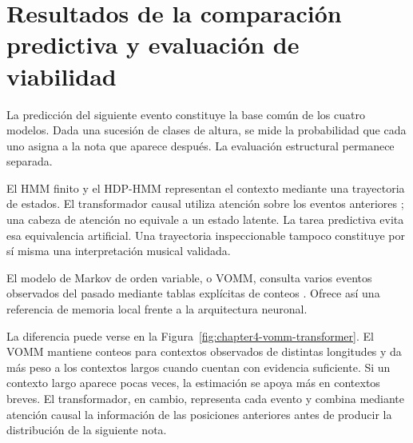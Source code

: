 \chapter[Resultados y evaluación de la solución]{Resultados de la comparación predictiva y evaluación de viabilidad}
\label{chap:comparacion-final}

La predicción del siguiente evento constituye la base común de los cuatro modelos. Dada una sucesión de clases de altura, se mide la probabilidad que cada uno asigna a la nota que aparece después. La evaluación estructural permanece separada.

El HMM finito y el HDP-HMM representan el contexto mediante una trayectoria de estados. El transformador causal utiliza atención sobre los eventos anteriores \cite{vaswani2017,huang2018musictransformer}; una cabeza de atención no equivale a un estado latente. La tarea predictiva evita esa equivalencia artificial. Una trayectoria inspeccionable tampoco constituye por sí misma una interpretación musical validada.

El modelo de Markov de orden variable, o VOMM, consulta varios eventos observados del pasado mediante tablas explícitas de conteos \cite{begleiter2004}. Ofrece así una referencia de memoria local frente a la arquitectura neuronal.

La diferencia puede verse en la Figura~\ref{fig:chapter4-vomm-transformer}. El VOMM mantiene conteos para contextos observados de distintas longitudes y da más peso a los contextos largos cuando cuentan con evidencia suficiente. Si un contexto largo aparece pocas veces, la estimación se apoya más en contextos breves. El transformador, en cambio, representa cada evento y combina mediante atención causal la información de las posiciones anteriores antes de producir la distribución de la siguiente nota.

